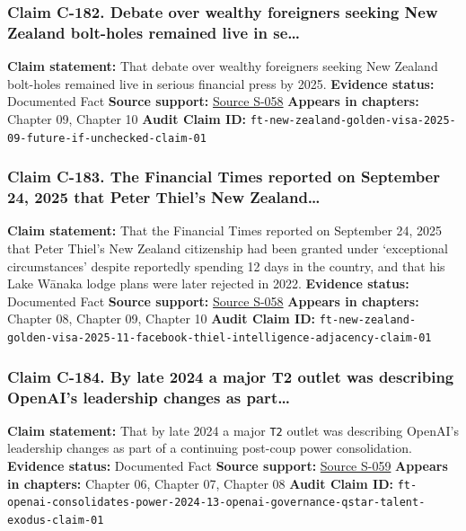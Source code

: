 \documentclass[
  american,
  11pt,
  letterpaper,
]{article}
\begin{document}
\subsubsection{Claim C-182. Debate over wealthy foreigners seeking New
Zealand bolt-holes remained live in
se\ldots{}}\label{claim-c-182-debate-over-wealthy-foreigners-seeking-new-zealand-bolt-holes-remained-live-in-se}

\textbf{Claim statement:} That debate over wealthy foreigners seeking
New Zealand bolt-holes remained live in serious financial press by 2025.
\textbf{Evidence status:} Documented Fact \textbf{Source support:}
\hyperref[source-s-058-new-zealand-woos-the-wealthy-with-golden-visa-changes]{Source
S-058} \textbf{Appears in chapters:} Chapter 09, Chapter 10
\textbf{Audit Claim ID:}
\texttt{ft-new-zealand-golden-visa-2025-09-future-if-unchecked-claim-01}

\subsubsection{Claim C-183. The Financial Times reported on September
24, 2025 that Peter Thiel's New
Zealand\ldots{}}\label{claim-c-183-the-financial-times-reported-on-september-24-2025-that-peter-thiel-s-new-zealand}

\textbf{Claim statement:} That the Financial Times reported on September
24, 2025 that Peter Thiel's New Zealand citizenship had been granted
under `exceptional circumstances' despite reportedly spending 12 days in
the country, and that his Lake Wānaka lodge plans were later rejected in
2022. \textbf{Evidence status:} Documented Fact \textbf{Source support:}
\hyperref[source-s-058-new-zealand-woos-the-wealthy-with-golden-visa-changes]{Source
S-058} \textbf{Appears in chapters:} Chapter 08, Chapter 09, Chapter 10
\textbf{Audit Claim ID:}
\texttt{ft-new-zealand-golden-visa-2025-11-facebook-thiel-intelligence-adjacency-claim-01}

\subsubsection{Claim C-184. By late 2024 a major T2 outlet was
describing OpenAI's leadership changes as
part\ldots{}}\label{claim-c-184-by-late-2024-a-major-t2-outlet-was-describing-openai-s-leadership-changes-as-part}

\textbf{Claim statement:} That by late 2024 a major \texttt{T2} outlet
was describing OpenAI's leadership changes as part of a continuing
post-coup power consolidation. \textbf{Evidence status:} Documented Fact
\textbf{Source support:}
\hyperref[source-s-059-who-s-left-at-openai-sam-altman-consolidates-power-after-failed-coup]{Source
S-059} \textbf{Appears in chapters:} Chapter 06, Chapter 07, Chapter 08
\textbf{Audit Claim ID:}
\texttt{ft-openai-consolidates-power-2024-13-openai-governance-qstar-talent-exodus-claim-01}
\end{document}
